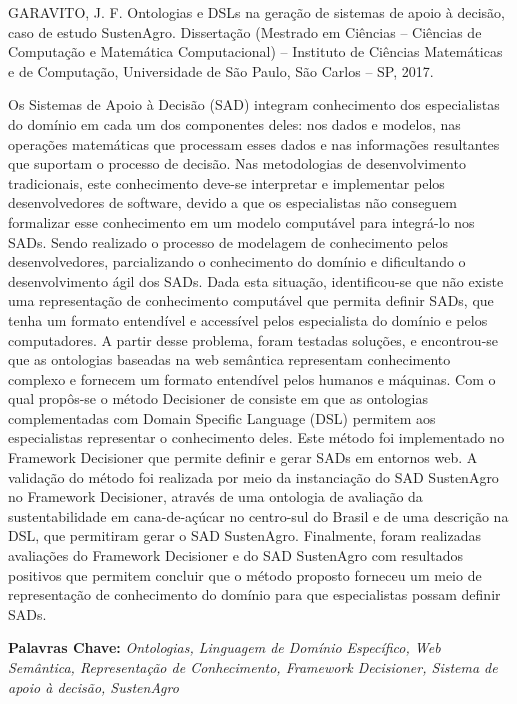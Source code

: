 GARAVITO, J. F. Ontologias e DSLs na geração de sistemas de apoio
à decisão, caso de estudo SustenAgro. Dissertação (Mestrado em Ciências
– Ciências de Computação e Matemática Computacional) – Instituto de
Ciências Matemáticas e de Computação, Universidade de São Paulo, São
Carlos – SP, 2017.

\vphantom{}

Os Sistemas de Apoio à Decisão (SAD)
integram conhecimento dos especialistas do domínio em cada um dos
componentes deles: nos dados e modelos, nas operações matemáticas
que processam esses dados e nas informações resultantes que suportam
o processo de decisão. Nas metodologias de desenvolvimento tradicionais,
este conhecimento deve-se interpretar e implementar pelos desenvolvedores
de software, devido a que os especialistas não conseguem formalizar
esse conhecimento em um modelo computável para integrá-lo nos SADs.
Sendo realizado o processo de modelagem de conhecimento pelos desenvolvedores,
parcializando o conhecimento do domínio e dificultando o desenvolvimento
ágil dos SADs. Dada esta situação, identificou-se que não existe uma
representação de conhecimento computável que permita definir SADs,
que tenha um formato entendível e accessível pelos especialista do
domínio e pelos computadores. A partir desse problema, foram testadas
soluções, e encontrou-se que as ontologias baseadas na web semântica
representam conhecimento complexo e fornecem um formato entendível
pelos humanos e máquinas. Com o qual propôs-se o método Decisioner
de consiste em que as ontologias complementadas com \foreignlanguage{english}{Domain
Specific Language} (DSL)
permitem aos especialistas representar o conhecimento deles. Este
método foi implementado no \foreignlanguage{english}{Framework} Decisioner
que permite definir e gerar SADs em entornos web. A validação do método
foi realizada por meio da instanciação do SAD SustenAgro no Framework
Decisioner, através de uma ontologia de avaliação da sustentabilidade
em cana-de-açúcar no centro-sul do Brasil e de uma descrição na DSL,
que permitiram gerar o SAD SustenAgro. Finalmente, foram realizadas
avaliações do Framework Decisioner e do SAD SustenAgro com resultados
positivos que permitem concluir que o método proposto forneceu um
meio de representação de conhecimento do domínio para que especialistas
possam definir SADs.

\vphantom{}

\textbf{Palavras Chave:} \emph{Ontologias, Linguagem de Domínio Específico,
Web Semântica, Representação de Conhecimento, Framework Decisioner,
Sistema de apoio à decisão, SustenAgro}
